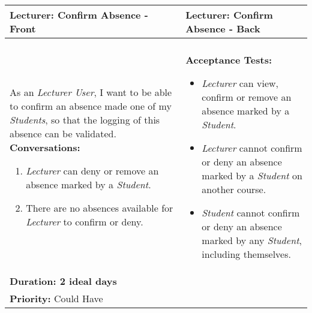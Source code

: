 \documentclass[11pt]{article}
\begin{document}
\begin{center}
\begin{tabular}{ | m{8cm}  |  m{8cm}  | } 
 \hline
 \textbf{Lecturer: Confirm Absence - Front} &  \textbf{Lecturer: Confirm Absence - Back}  \\ 
  \hline
&\\[5pt]
As an \emph{Lecturer User}, I want to be able to confirm an absence made one of my \emph{Students}, so that the logging of this absence can be validated.\newline
\textbf{Conversations:}
\begin{enumerate}
\item{\emph{Lecturer} can deny or remove an absence marked by a \emph{Student}.}
\item{There are no absences available for \emph{Lecturer} to confirm or deny.}
\end{enumerate}
& \textbf{Acceptance Tests:} 
\begin{itemize}
\item{\emph{Lecturer} can view, confirm or remove an absence marked by a \emph{Student}.}
\item{\emph{Lecturer} cannot confirm or deny an absence marked by a \emph{Student} on another course.}
\item{\emph{Student} cannot confirm or deny an absence marked by any \emph{Student}, including themselves.}
\end{itemize} \\
\textbf{Duration: 2 ideal days} &\\
\textbf{Priority:}  \textcolor{dkgreen}{Could Have} & \\
 \hline
\end{tabular}
\end{center}
\end{document}
